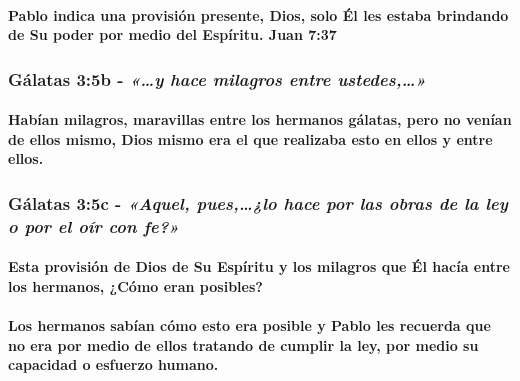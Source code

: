 \documentclass[11a pt,twoside]{article}
\newcommand{\scripture}[1]{%
  {\fontsize{12pt}{16pt}\selectfont\ScriptureFont\itshape #1}%
}
\let\oldsubsubsection\subsubsection
\renewcommand{\subsubsection}{\needspace{4\baselineskip}\oldsubsubsection}
\let\oldparagraph\paragraph
\renewcommand{\paragraph}{\needspace{3\baselineskip}\oldparagraph}
\begin{document}
\paragraph{Pablo indica una provisión presente, Dios, solo Él les estaba
brindando de Su poder por medio del Espíritu. Juan
7:37}\label{pablo-indica-una-provisiuxf3n-presente-dios-solo-uxe9l-les-estaba-brindando-de-su-poder-por-medio-del-espuxedritu.-juan-737}

\subsubsection{\texorpdfstring{Gálatas 3:5b -
\scripture{«…y hace milagros entre ustedes,…»}}{Gálatas 3:5b - }}\label{guxe1latas-35b---y-hace-milagros-entre-ustedes}

\paragraph{Habían milagros, maravillas entre los hermanos gálatas, pero
no venían de ellos mismo, Dios mismo era el que realizaba esto en ellos
y entre
ellos.}\label{habuxedan-milagros-maravillas-entre-los-hermanos-guxe1latas-pero-no-venuxedan-de-ellos-mismo-dios-mismo-era-el-que-realizaba-esto-en-ellos-y-entre-ellos.}

\subsubsection{\texorpdfstring{Gálatas 3:5c -
\scripture{«Aquel, pues,…¿lo hace por las obras de la ley o por el oír con fe?»}}{Gálatas 3:5c - }}\label{guxe1latas-35c---aquel-pueslo-hace-por-las-obras-de-la-ley-o-por-el-ouxedr-con-fe}

\paragraph{Esta provisión de Dios de Su Espíritu y los milagros que Él
hacía entre los hermanos, ¿Cómo eran
posibles?}\label{esta-provisiuxf3n-de-dios-de-su-espuxedritu-y-los-milagros-que-uxe9l-hacuxeda-entre-los-hermanos-cuxf3mo-eran-posibles}

\paragraph{Los hermanos sabían cómo esto era posible y Pablo les
recuerda que no era por medio de ellos tratando de cumplir la ley, por
medio su capacidad o esfuerzo
humano.}\label{los-hermanos-sabuxedan-cuxf3mo-esto-era-posible-y-pablo-les-recuerda-que-no-era-por-medio-de-ellos-tratando-de-cumplir-la-ley-por-medio-su-capacidad-o-esfuerzo-humano.}
\end{document}
